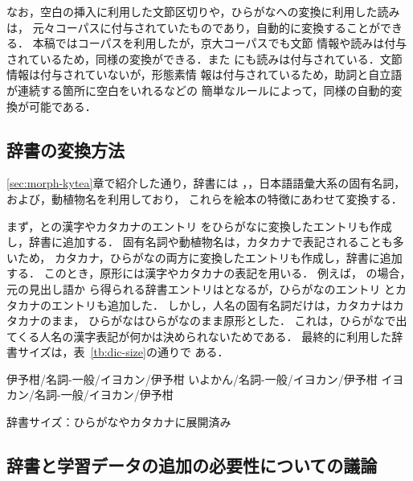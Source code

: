 \documentclass[japanese]{jnlp_1.4}
\newcommand{\bccwj}{}
\newcommand{\lxd}{}
\newcommand{\ntj}{}
\newcommand{\hinoki}{}
\newcommand{\refs}[1]{}
\begin{document}
なお，空白の挿入に利用した文節区切りや，ひらがなへの変換に利用した読みは，
元々コーパスに付与されていたものであり，自動的に変換することができる．
本稿では\hinoki コーパスを利用したが，京大コーパスでも文節
情報や読みは付与されているため，同様の変換ができる．また\bccwj 
にも読みは付与されている．文節情報は付与されていないが，形態素情
報は付与されているため，助詞と自立語が連続する箇所に空白をいれるなどの
簡単なルールによって，同様の自動的変換が可能である．


\subsection{辞書の変換方法}
\label{sec:dic}

\ref{sec:morph-kytea}章で紹介した通り，辞書には
\ntj，\lxd，日本語語彙大系の固有名詞，および，動植物名を利用しており，
これらを絵本の特徴にあわせて変換する．

まず，\ntj と\lxd の漢字やカタカナのエントリ
をひらがなに変換したエントリも作成し，辞書に追加する．
固有名詞や動植物名は，カタカナで表記されることも多いため，
カタカナ，ひらがなの両方に変換したエントリも作成し，辞書に追加する．
このとき，原形には漢字やカタカナの表記を用いる．
例えば，
\jpn[伊予柑]{}の場合，元の見出し語か
ら得られる辞書エントリは\refs{iyokan-org}となるが，ひらがなのエントリ
\refs{iyokan-hira}とカタカナのエントリ\refs{iyokan-kata}も追加した．
しかし，人名の固有名詞だけは，カタカナはカタカナのまま，
ひらがなはひらがなのまま原形とした．
これは，ひらがなで出てくる人名の漢字表記が何かは決められないためである．
最終的に利用した辞書サイズは，表~\ref{tb:dic-size}の通りで
ある．

\begin{exe}
  \ex \label{s:iyokan-org}
  伊予柑/名詞-一般/イヨカン/伊予柑
  \ex \label{s:iyokan-hira}
  いよかん/名詞-一般/イヨカン/伊予柑
  \ex \label{s:iyokan-kata}
  イヨカン/名詞-一般/イヨカン/伊予柑
\end{exe}

\begin{table}[b]
\caption{辞書サイズ：ひらがなやカタカナに展開済み}
\label{tb:dic-size}

\end{table}


\subsection{辞書と学習データの追加の必要性についての議論}
\label{sec:comp-kudo}
\end{document}
